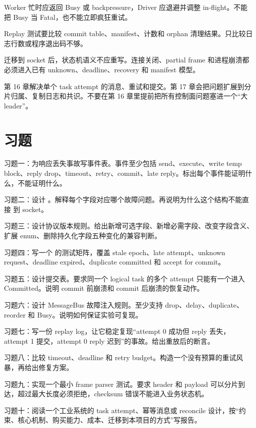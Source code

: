Worker 忙时应返回 Busy 或 backpressure，Driver 应退避并调整 in-flight。不能把 Busy 当 Fatal，也不能立即疯狂重试。

Replay 测试要比较 commit table、manifest、计数和 orphan 清理结果。只比较日志行数或程序退出码不够。

迁移到 socket 后，状态机语义不应重写。连接关闭、partial frame 和进程崩溃都必须进入已有 unknown、deadline、recovery 和 manifest 模型。

第 16 章解决单个 task attempt 的消息、重试和提交。第 17 章会把问题扩展到分片归属、复制日志和共识。不要在第 16 章里提前把所有控制面问题塞进一个“大 leader”。

\section{习题}

\begin{exercisebox}
习题一：为响应丢失事故写事件表。事件至少包括 send、execute、write temp block、reply drop、timeout、retry、commit、late reply。标出每个事件能证明什么，不能证明什么。

习题二：设计 。解释每个字段对应哪个故障问题。再说明为什么这个结构不能直接  到 socket。

习题三：设计协议版本规则。给出新增可选字段、新增必需字段、改变字段含义、扩展 enum、删除持久化字段五种变化的兼容判断。

习题四：写一个  的测试矩阵，覆盖 stale epoch、late attempt、unknown request、deadline expired、duplicate committed 和 accept for commit。

习题五：设计提交表。要求同一个 logical task 的多个 attempt 只能有一个进入 Committed。说明 commit 前崩溃和 commit 后崩溃的恢复动作。

习题六：设计 MessageBus 故障注入规则。至少支持 drop、delay、duplicate、reorder 和 Busy。说明如何保证实验可复现。

习题七：写一份 replay log，让它稳定复现“attempt 0 成功但 reply 丢失，attempt 1 提交，attempt 0 reply 迟到”的事故。给出重放后的断言。

习题八：比较 timeout、deadline 和 retry budget。构造一个没有预算的重试风暴，再给出修复方案。

习题九：实现一个最小 frame parser 测试。要求 header 和 payload 可以分片到达，超过最大长度必须拒绝，checksum 错误不能进入业务状态机。

习题十：阅读一个工业系统的 task attempt、幂等消息或 reconcile 设计，按“约束、核心机制、购买能力、成本、迁移到本项目的方式”写报告。
\end{exercisebox}
